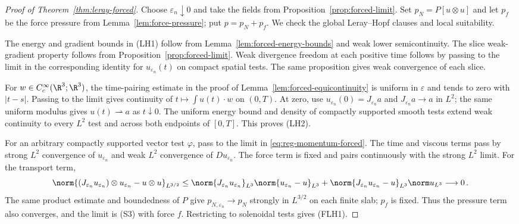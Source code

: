 \documentclass[11pt,reqno]{amsart}
\begin{document}
\begin{proof}[Proof of Theorem~\ref{thm:leray-forced}]
Choose $\varepsilon_n\downarrow0$ and take the fields from
Proposition~\ref{prop:forced-limit}. Set $p_N=P[u\otimes u]$ and let
$p_f$ be the force pressure from Lemma~\ref{lem:force-pressure}; put
$p=p_N+p_f$. We check the global Leray--Hopf clauses and local suitability.

The energy and gradient bounds in (LH1) follow from
Lemma~\ref{lem:forced-energy-bounds} and weak lower semicontinuity. The
slice weak-gradient property follows from Proposition~\ref{prop:forced-limit}.
Weak divergence freedom at each positive time follows by passing to the
limit in the corresponding identity for $u_{\varepsilon_n}(t)$ on compact
spatial tests. The same proposition gives weak convergence of each slice.

For $w\in C_c^\infty(\R^3;\R^3)$, the time-pairing estimate in the proof
of Lemma~\ref{lem:forced-equicontinuity} is uniform in $\varepsilon$ and
tends to zero with $|t-s|$. Passing to the limit gives continuity of
$t\mapsto\int u(t)\cdot w$ on $(0,T)$. At zero, use
$u_{\varepsilon_n}(0)=J_{\varepsilon_n}a$ and
$J_{\varepsilon_n}a\to a$ in $L^2$; the same uniform modulus gives
$u(t)\rightharpoonup a$ as $t\downarrow0$. The uniform energy bound and
density of compactly supported smooth tests extend weak continuity to
every $L^2$ test and across both endpoints of $[0,T]$. This proves (LH2).

For an arbitrary compactly supported vector test $\varphi$, pass to the
limit in \eqref{eq:reg-momentum-forced}. The time and viscous terms pass by
strong $L^2$ convergence of $u_{\varepsilon_n}$ and weak $L^2$
convergence of $Du_{\varepsilon_n}$. The force term is fixed and pairs
continuously with the strong $L^2$ limit. For the transport term,
\[
 \norm{(J_{\varepsilon_n}u_{\varepsilon_n})\otimes
            u_{\varepsilon_n}-u\otimes u}_{L^{3/2}}
 \le \norm{J_{\varepsilon_n}u_{\varepsilon_n}}_{L^3}
          \norm{u_{\varepsilon_n}-u}_{L^3}
      +\norm{J_{\varepsilon_n}u_{\varepsilon_n}-u}_{L^3}
          \norm u_{L^3}\longrightarrow0\,.
\]
The same product estimate and boundedness of $P$ give
$p_{N,\varepsilon_n}\to p_N$ strongly in $L^{3/2}$ on each finite slab;
$p_f$ is fixed. Thus the pressure term also converges, and the limit is
(S3) with force $f$. Restricting to solenoidal tests gives (FLH1).


\end{proof}
\end{document}
